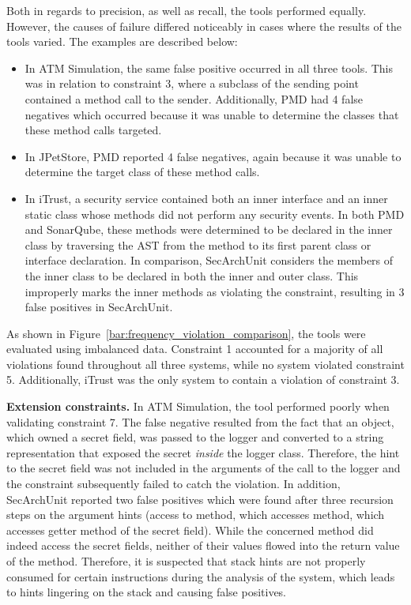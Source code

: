 Both in regards to precision, as well as recall, the tools performed equally. However, the causes of failure differed noticeably in cases where the results of the tools varied. The examples are described below:

\begin{itemize}
    \item In ATM Simulation, the same false positive occurred in all three tools. This was in relation to constraint 3, where a subclass of the sending point contained a method call to the sender. Additionally, PMD had 4 false negatives which occurred because it was unable to determine the classes that these method calls targeted.
    \item In JPetStore, PMD reported 4 false negatives, again because it was unable to determine the target class of these method calls.
    \item In iTrust, a security service contained both an inner interface and an inner static class whose methods did not perform any security events. In both PMD and SonarQube, these methods were determined to be declared in the inner class by traversing the AST from the method to its first parent class or interface declaration. In comparison, SecArchUnit considers the members of the inner class to be declared in both the inner and outer class. This improperly marks the inner methods as violating the constraint, resulting in 3 false positives in SecArchUnit.
\end{itemize}

As shown in Figure~\ref{bar:frequency_violation_comparison}, the tools were evaluated using imbalanced data. Constraint 1 accounted for a majority of all violations found throughout all three systems, while no system violated constraint 5. Additionally, iTrust was the only system to contain a violation of constraint 3. 

\textbf{Extension constraints.}
In ATM Simulation, the tool performed poorly when validating constraint 7. The false negative resulted from the fact that an object, which owned a secret field, was passed to the logger and converted to a string representation that exposed the secret \textit{inside} the logger class. Therefore, the hint to the secret field was not included in the arguments of the call to the logger and the constraint subsequently failed to catch the violation. In addition, SecArchUnit reported two false positives which were found after three recursion steps on the argument hints (access to method, which accesses method, which accesses getter method of the secret field). While the concerned method did indeed access the secret fields, neither of their values flowed into the return value of the method. Therefore, it is suspected that stack hints are not properly consumed for certain instructions during the analysis of the system, which leads to hints lingering on the stack and causing false positives.

